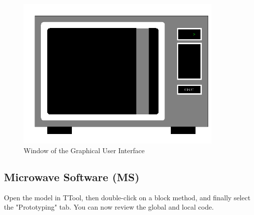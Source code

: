 \documentclass[12pt]{article}
\begin{document}
\begin{figure}[htbp]
\centering
\includegraphics[width=0.9\textwidth]{figures/gui1}
\caption{Window of the Graphical User Interface} \label{fig:gui1}
\end{figure}

\subsection{Microwave Software (MS)}
Open the model in TTool, then double-click on a block method, and finally select the "Prototyping" tab. You can now review the global and local code.
\end{document}

